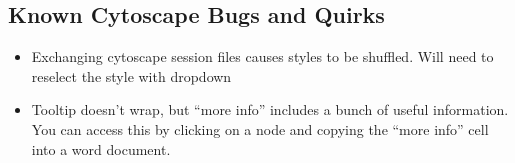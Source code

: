 \subsection{Known Cytoscape Bugs and Quirks}
\begin{itemize}
	\item Exchanging cytoscape session files causes styles to be shuffled. Will need to reselect the style with dropdown
	\item Tooltip doesn't wrap, but ``more info'' includes a bunch of useful information. You can access this by clicking on a node and copying the ``more info'' cell into a word document.
\end{itemize}


